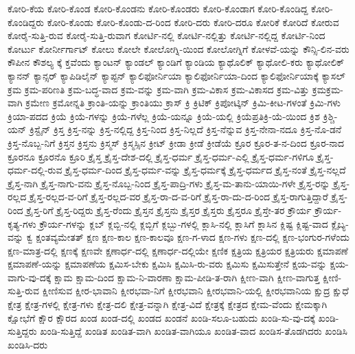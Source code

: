 {ಕೋರಿ-ಕೆಯ
ಕೋರಿ-ಕೊಂಡ
ಕೋರಿ-ಕೊಂಡನು
ಕೋರಿ-ಕೊಂಡರು
ಕೋರಿ-ಕೊಂಡಾಗ
ಕೋರಿ-ಕೊಂಡಿದ್ದ
ಕೋರಿ-ಕೊಂಡಿದ್ದರು
ಕೋರಿ-ಕೊಂಡು
ಕೋರಿ-ಕೊಂಡು-ದ-ರಿಂದ
ಕೋರಿ-ದರು
ಕೋರಿ-ದರೂ
ಕೋರಿಕೆ
ಕೋರಿದೆ
ಕೋರುವ
ಕೋರೈ-ಸುತ್ತಿ-ರುವ
ಕೋರೈ-ಸುತ್ತಿ-ರುವಾಗ
ಕೋರ್ಟಿ-ನಲ್ಲಿ
ಕೋರ್ಟಿ-ನಲ್ಲಿತ್ತು
ಕೋರ್ಟಿ-ನಲ್ಲಿದ್ದ
ಕೋರ್ಟಿ-ನಿಂದ
ಕೋರ್ಟು
ಕೋರ್ನೀರ್ಗಾಟ್
ಕೋಲು
ಕೋಲೇ
ಕೋಲೋಗ್ನಿ-ಯಿಂದ
ಕೋಲೋಗ್ನಿಗೆ
ಕೋಳವೆ-ಯನ್ನು
ಕೌನ್ಸಿ-ಲಿನ-ವರು
ಕೌಪೀನ
ಕೌಶಲ್ಯ
ಕ್ಕೆ
ಕ್ತವೆಂದು
ಕ್ಯಾಂಟನ್
ಕ್ಯಾಂಡಲ್
ಕ್ಯಾಂಡಿಗೆ
ಕ್ಯಾಂಡಿಯ
ಕ್ಯಾಥೊಲಿಕ್
ಕ್ಯಾಥೋಲಿ-ಕರು
ಕ್ಯಾಥೋಲಿಕ್
ಕ್ಯಾನನ್
ಕ್ಯಾನ್ಸರ್
ಕ್ಯಾಪಿಡಿಲೈನ್
ಕ್ಯಾಪ್ಟನ್
ಕ್ಯಾಲಿಫೋರ್ನಿಯಾ
ಕ್ಯಾಲಿಫೋರ್ನಿಯಾ-ದಿಂದ
ಕ್ಯಾಲಿಫೋರ್ನಿಯಾಕ್ಕೆ
ಕ್ಯಾಸಲ್
ಕ್ರಮ
ಕ್ರಮ-ಪರಿಣತಿ
ಕ್ರಮ-ಬದ್ಧ-ವಾದ
ಕ್ರಮ-ವನ್ನು
ಕ್ರಮ-ವಾಗಿ
ಕ್ರಮ-ವಿಕಾಸ
ಕ್ರಮ-ವಿಕಾಸದ
ಕ್ರಮ-ವಿತ್ತು
ಕ್ರಮಕ್ರಮ-ವಾಗಿ
ಕ್ರಮೇಣ
ಕ್ರಮೋನ್ನತಿ
ಕ್ರಾಂತಿ-ಯನ್ನು
ಕ್ರಾಂತಿಯು
ಕ್ರಾಸ್
ಕ್ರಿ
ಕ್ರಿಟಿಕ್
ಕ್ರಿಪೋಟ್ಕಿನ್
ಕ್ರಿಮಿ-ಕೀಟ-ಗಳಂತೆ
ಕ್ರಿಮಿ-ಗಳು
ಕ್ರಿಯಾ-ಪದದ
ಕ್ರಿಯೆ
ಕ್ರಿಯೆ-ಗಳನ್ನು
ಕ್ರಿಯೆ-ಗಳೆಲ್ಲ
ಕ್ರಿಯೆ-ಯನ್ನೂ
ಕ್ರಿಯೆ-ಯಲ್ಲಿ
ಕ್ರಿಯೆಪ್ರತಿಕ್ರಿ-ಯೆ-ಯಿಂದ
ಕ್ರಿಶ
ಕ್ರಿಶ್ಚಿ-ಯನ್
ಕ್ರಿಸ್ಟೈನ್
ಕ್ರಿಸ್ತ
ಕ್ರಿಸ್ತ-ನನ್ನು
ಕ್ರಿಸ್ತ-ನಲ್ಲಿದ್ದ
ಕ್ರಿಸ್ತ-ನಿಂದ
ಕ್ರಿಸ್ತ-ನಿಲ್ಲದೆ
ಕ್ರಿಸ್ತ-ನೆನ್ನುವ
ಕ್ರಿಸ್ತ-ನೇನಾ-ನದೂ
ಕ್ರಿಸ್ತ-ನೊ-ಡನೆ
ಕ್ರಿಸ್ತ-ನೊಬ್ಬ-ನಿಗೆ
ಕ್ರಿಸ್ತನ
ಕ್ರಿಸ್ತನು
ಕ್ರಿಸ್ಮಸ್
ಕ್ರಿಸ್ಮಸ್ಸಿನ
ಕ್ರೀಟ್
ಕ್ರೀಡಾ
ಕ್ರೀಡೆ
ಕ್ರೀಡೆಯೆ
ಕ್ರೂರ
ಕ್ರೂರ-ತ-ನ-ದಿಂದ
ಕ್ರೂರ-ನಾದ
ಕ್ರೂರನೂ
ಕ್ರೂರನೊ
ಕ್ರೂರಿ
ಕ್ರೈಸ್ತ
ಕ್ರೈಸ್ತ-ದೇಶ-ದಲ್ಲಿ
ಕ್ರೈಸ್ತ-ಧರ್ಮ
ಕ್ರೈಸ್ತ-ಧರ್ಮ-ಎಲ್ಲಿ
ಕ್ರೈಸ್ತ-ಧರ್ಮ-ಗಳಿಗೂ
ಕ್ರೈಸ್ತ-ಧರ್ಮ-ದಲ್ಲಿ-ರುವ
ಕ್ರೈಸ್ತ-ಧರ್ಮ-ದಿಂದ
ಕ್ರೈಸ್ತ-ಧರ್ಮ-ವನ್ನು
ಕ್ರೈಸ್ತ-ಧರ್ಮಕ್ಕೆ
ಕ್ರೈಸ್ತ-ಧರ್ಮದ
ಕ್ರೈಸ್ತ-ನಂತೆ
ಕ್ರೈಸ್ತ-ನಲ್ಲದೆ
ಕ್ರೈಸ್ತ-ನಾಗಿ
ಕ್ರೈಸ್ತ-ನಾಗು-ವನು
ಕ್ರೈಸ್ತ-ನೊಬ್ಬ-ನಿಂದ
ಕ್ರೈಸ್ತ-ಪಾದ್ರಿ-ಗಳು
ಕ್ರೈಸ್ತ-ಮ-ತಾನು-ಯಾಯಿ-ಗಳೇ
ಕ್ರೈಸ್ತ-ರನ್ನು
ಕ್ರೈಸ್ತ-ರಲ್ಲದ
ಕ್ರೈಸ್ತ-ರಲ್ಲದ-ವ-ರಿಗೆ
ಕ್ರೈಸ್ತ-ರಲ್ಲದ-ವರ
ಕ್ರೈಸ್ತ-ರಾ-ದ-ವ-ರಿಗೆ
ಕ್ರೈಸ್ತ-ರಾ-ದು-ದ-ರಿಂದ
ಕ್ರೈಸ್ತ-ರಾಗುತ್ತಿದ್ದಾರೆ
ಕ್ರೈಸ್ತ-ರಿಂದ
ಕ್ರೈಸ್ತ-ರಿಗೆ
ಕ್ರೈಸ್ತ-ರಿದ್ದರು
ಕ್ರೈಸ್ತ-ರೆಂದು
ಕ್ರೈಸ್ತನ
ಕ್ರೈಸ್ತನು
ಕ್ರೈಸ್ತರ
ಕ್ರೈಸ್ತರು
ಕ್ರೈಸ್ತರೂ
ಕ್ರೈಸ್ತೇ-ತರ
ಕ್ರೌರ್ಯ
ಕ್ರೌರ್ಯ-ಕೃತ್ಯ-ಗಳು
ಕ್ರೌರ್ಯ-ಗಳನ್ನು
ಕ್ಲಬ್
ಕ್ಲಬ್ಬಿ-ನಲ್ಲಿ
ಕ್ಲಬ್ಬಿಗೆ
ಕ್ಲಬ್ಬು-ಗಳಲ್ಲಿ
ಕ್ಲಾಸಿ-ನಲ್ಲಿ
ಕ್ಲಾಸಿಗೆ
ಕ್ಲಾಸಿನ
ಕ್ಲಿಷ್ಟ
ಕ್ಲಿಷ್ಟ-ವಾದ
ಕ್ಲೈಬ್ಯ-ವನ್ನು
ಕ್ವ
ಕ್ಷಂತವ್ಯಮೇತತ್
ಕ್ಷಣ
ಕ್ಷಣ-ಕಾಲ
ಕ್ಷಣ-ಕಾಲವೂ
ಕ್ಷಣ-ಗ-ಳಾದ
ಕ್ಷಣ-ಗಳು
ಕ್ಷಣ-ದಲ್ಲಿ
ಕ್ಷಣ-ಭಂಗುರ-ಗಳೆಂದು
ಕ್ಷಣ-ಮಾತ್ರ-ದಲ್ಲಿ
ಕ್ಷಣಕ್ಕೆ
ಕ್ಷಣವೇ
ಕ್ಷಣಾರ್ಧ-ದಲ್ಲಿ
ಕ್ಷಣಾರ್ಧ-ದಲ್ಲಿಯೇ
ಕ್ಷಣಿಕ
ಕ್ಷತ್ರಿಯ
ಕ್ಷತ್ರಿಯರ
ಕ್ಷತ್ರಿಯರು
ಕ್ಷಮಾಪಣೆ
ಕ್ಷಮಾಪಣೆ-ಯನ್ನು
ಕ್ಷಮಾಪಣೆಯ
ಕ್ಷಮಿಸ-ಬೇಕು
ಕ್ಷಮಿಸಿ
ಕ್ಷಮಿಸಿ-ರು-ವರು
ಕ್ಷಮಿಸು
ಕ್ಷಮಿಸುತ್ತೇನೆ
ಕ್ಷಯ-ವನ್ನು
ಕ್ಷಯ-ವಾಗು-ವು-ದಕ್ಕೆ
ಕ್ಷಾಮ
ಕ್ಷಾಮ-ದಿಂದ
ಕ್ಷಾಮ-ನಿ-ವಾರಣಾ
ಕ್ಷಾಮ-ಪೀಡಿ-ತ-ರಾಗಿ
ಕ್ಷೀಣ-ವಾಗಿ
ಕ್ಷೀಣ-ವಾಗುತ್ತ
ಕ್ಷೀಣಿ-ಸುತ್ತಿ-ರುವ
ಕ್ಷೀಣಿಸುವ
ಕ್ಷೀರ-ಭಾವಾನಿ
ಕ್ಷೀರಭವಾ-ನಿಗೆ
ಕ್ಷೀರಭವಾನಿ
ಕ್ಷೀರಭವಾನಿ-ಯಲ್ಲಿ
ಕ್ಷೀರಭವಾನಿಯ
ಕ್ಷುದ್ರ
ಕ್ಷುಧೆ
ಕ್ಷೇತ್ರ
ಕ್ಷೇತ್ರ-ಗಳಲ್ಲಿ
ಕ್ಷೇತ್ರ-ಗಳು
ಕ್ಷೇತ್ರ-ದಲಿ
ಕ್ಷೇತ್ರ-ವನ್ನಾಗಿ
ಕ್ಷೇತ್ರ-ವಿದೆ
ಕ್ಷೇತ್ರಕ್ಕೆ
ಕ್ಷೇತ್ರದ
ಕ್ಷೇಮ-ವೆಂದು
ಕ್ಷೇಮಕ್ಕಾಗಿ
ಕ್ಷೋಭೆಗೆ
ಕ್ಷೌರ
ಕ್ಷೌರದ
ಖಂಡ
ಖಂಡ-ದಲ್ಲಿ
ಖಂಡದ
ಖಂಡನೆ
ಖಂಡಿ-ಸಲೂ-ಬಹುದು
ಖಂಡಿ-ಸು-ವು-ದಕ್ಕೆ
ಖಂಡಿ-ಸುತ್ತಿದ್ದರು
ಖಂಡಿ-ಸುತ್ತಿದ್ದೆ
ಖಂಡಿತ
ಖಂಡಿತ-ವಾಗಿ
ಖಂಡಿತ-ವಾಗಿಯೂ
ಖಂಡಿತ-ವಾದ
ಖಂಡಿಸ-ತೊಡಗಿದರು
ಖಂಡಿಸಿ
ಖಂಡಿಸಿ-ದರು
}
